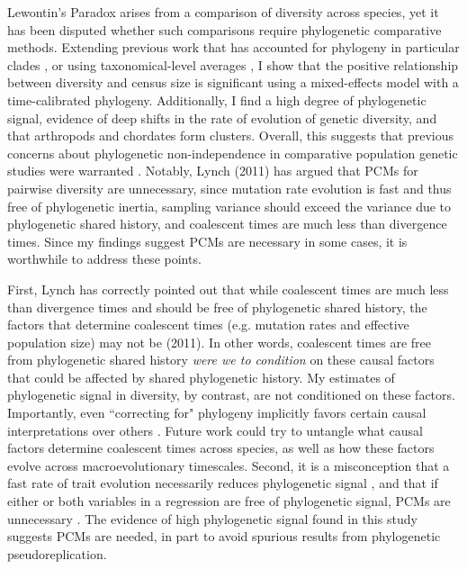 \documentclass[11pt]{article}
\begin{document}

Lewontin's Paradox arises from a comparison of diversity across species, yet it
has been disputed whether such comparisons require phylogenetic comparative
methods. Extending previous work that has accounted for phylogeny in particular
clades \parencite{Leffler2012-zj}, or using taxonomical-level averages
\parencite{Romiguier2014-bp}, I show that the positive relationship between
diversity and census size is significant using a mixed-effects model with a
time-calibrated phylogeny. Additionally, I find a high degree of phylogenetic
signal, evidence of deep shifts in the rate of evolution of genetic diversity,
and that arthropods and chordates form clusters. Overall, this suggests that
previous concerns about phylogenetic non-independence in comparative population
genetic studies were warranted \parencite{Gillespie1991-qa,Whitney2010-ud}.
Notably, Lynch (2011) has argued that PCMs for pairwise diversity are
unnecessary, since mutation rate evolution is fast and thus free of
phylogenetic inertia, sampling variance should exceed the variance due to
phylogenetic shared history, and coalescent times are much less than divergence
times. Since my findings suggest PCMs are necessary in some cases, it is
worthwhile to address these points. 

First, Lynch has correctly pointed out that while coalescent times are much
less than divergence times and should be free of phylogenetic shared history,
the factors that determine coalescent times (e.g.  mutation rates and effective
population size) may not be (2011). In other words, coalescent times are free
from phylogenetic shared history \emph{were we to condition} on these causal
factors that could be affected by shared phylogenetic history. My estimates of
phylogenetic signal in diversity, by contrast, are not conditioned on these
factors. Importantly, even ``correcting for" phylogeny implicitly favors
certain causal interpretations over others
\parencite{Westoby1995-wz,Uyeda2018-wf}. Future work could try to untangle what
causal factors determine coalescent times across species, as well as how these
factors evolve across macroevolutionary timescales. Second, it is a
misconception that a fast rate of trait evolution necessarily reduces
phylogenetic signal \parencite{Revell2008-in}, and that if either or both
variables in a regression are free of phylogenetic signal, PCMs are unnecessary
\parencite{Revell2010-mf,Uyeda2018-wf}. The evidence of high phylogenetic
signal found in this study suggests PCMs are needed, in part to avoid spurious
results from phylogenetic pseudoreplication.
\end{document}

